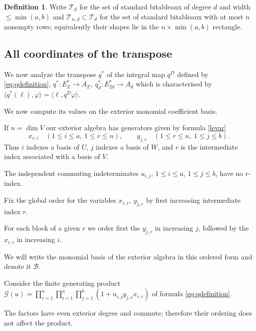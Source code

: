 \documentclass[10pt]{amsart}
\theoremstyle{definition}
\newtheorem{definition}[theorem]{Definition}
\theoremstyle{remark}
\newcommand{\Z}{\mathbb Z}
\begin{document}
 \begin{definition}\label{Tabb}
Write  $\mathcal T_{ d}$ for the set of standard bitableaux of degree $d$ and width $\leq \min(a,b)$ and  $\mathcal T_{n,d}\subset \mathcal T_{ d}$ for the set of standard bitableaux with at most $n$ nonempty rows; equivalently their shapes lie in the $n\times\min(a,b)$ rectangle.
\end{definition}    
\par\medskip

\subsection{All coordinates of the transpose}
\label{subsec:all-transpose-coordinates}
 
 We now analyze the transpose $q ^*$ of the integral map $q ^D$  defined by \eqref{eq:qdefinition},   $q ^*:E_{\Z}^*\to A_\Z,\  q_d^*:E_{2d}^*\to A_d$  which is characterised by $\langle q^*(\ell),\varphi\rangle=\langle \ell , q^D\varphi\rangle $.
 
 We now compute its values on the exterior monomial coefficient basis.\smallskip

  If $n=\dim V$ our exterior
algebra has generators given by formula \eqref{levar}
\[
 x_{ r,i}\quad (1\leq i\leq a,\ 1\leq r\leq n),\qquad
 y_{j,r}\quad (1\leq r\leq n,\ 1\leq j\leq b).
\]
Thus $i$ indexes a basis of $U$, $j$ indexes a basis of $W$, and $r$ is the intermediate
index associated with a basis of $V$.\smallskip

 The independent commuting indeterminates
$u_{i,j}$, $1\leq i\leq a$, $1\leq j\leq b$, have no $r$-index.\medskip

Fix the global order for the variables $  x_{ r,i},\ 
 y_{j,r}$ by first increasing intermediate index $r$. 
 
 For each block of a given $r$ we  order first the $y_{j,r}$ in increasing $j$, followed by the $x_{r,i}$ in increasing $i$.\smallskip
 
 
 We will write the monomial basis of the exterior algebra in this ordered form and denote it $\mathcal B$.\label{order}\medskip
  

Consider the finite generating product $
 \mathcal G(u)=\prod_{r=1}^{n}\prod_{i=1}^{a}\prod_{j=1}^{b}
       (1+u_{i,j}y_{j,r}x_{r,i})$ of formula \eqref{eq:qdefinition}.

The factors have even exterior degree and commute; therefore their
ordering does not affect the product. \smallskip
\end{document}
